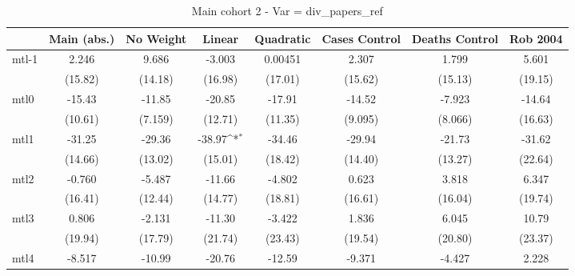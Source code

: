 \documentclass{article}
\begin{document}
{
\def\sym#1{\ifmmode^{#1}\else\(^{#1}\)\fi}
\begin{longtable}{l*{7}{c}}
\caption{Main cohort 2 - Var = div\_papers\_ref}\\
\hline\hline\endfirsthead\hline\endhead\hline\endfoot\endlastfoot
                &\multicolumn{1}{c}{Main (abs.)}&\multicolumn{1}{c}{No Weight}&\multicolumn{1}{c}{Linear}&\multicolumn{1}{c}{Quadratic}&\multicolumn{1}{c}{Cases Control}&\multicolumn{1}{c}{Deaths Control}&\multicolumn{1}{c}{Rob 2004}\\
\hline
mtl-1           &    2.246         &    9.686         &   -3.003         &  0.00451         &    2.307         &    1.799         &    5.601         \\
                &  (15.82)         &  (14.18)         &  (16.98)         &  (17.01)         &  (15.62)         &  (15.13)         &  (19.15)         \\
mtl0            &   -15.43         &   -11.85         &   -20.85         &   -17.91         &   -14.52         &   -7.923         &   -14.64         \\
                &  (10.61)         &  (7.159)         &  (12.71)         &  (11.35)         &  (9.095)         &  (8.066)         &  (16.63)         \\
mtl1            &   -31.25         &   -29.36         &   -38.97\sym{*}  &   -34.46         &   -29.94         &   -21.73         &   -31.62         \\
                &  (14.66)         &  (13.02)         &  (15.01)         &  (18.42)         &  (14.40)         &  (13.27)         &  (22.64)         \\
mtl2            &   -0.760         &   -5.487         &   -11.66         &   -4.802         &    0.623         &    3.818         &    6.347         \\
                &  (16.41)         &  (12.44)         &  (14.77)         &  (18.81)         &  (16.61)         &  (16.04)         &  (19.74)         \\
mtl3            &    0.806         &   -2.131         &   -11.30         &   -3.422         &    1.836         &    6.045         &    10.79         \\
                &  (19.94)         &  (17.79)         &  (21.74)         &  (23.43)         &  (19.54)         &  (20.80)         &  (23.37)         \\
mtl4            &   -8.517         &   -10.99         &   -20.76         &   -12.59         &   -9.371         &   -4.427         &    2.228         \\

\end{longtable}}
\end{document}
